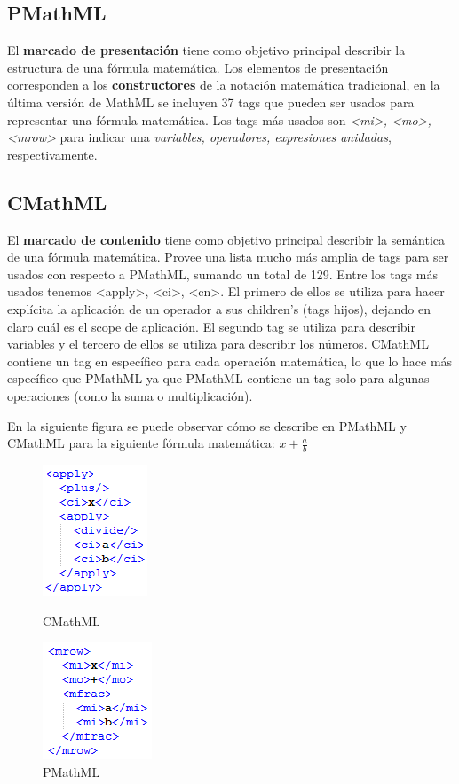 \subsection{PMathML}

El \textbf{marcado de presentación} tiene como objetivo principal describir la estructura de una fórmula matemática.
Los elementos de presentación corresponden a los \textbf{constructores} de la notación matemática tradicional, en la última versión de MathML se incluyen
37 tags que pueden ser usados para representar una fórmula matemática. Los tags más usados son \textit{<mi>, <mo>, <mrow>} para indicar una \textit{variables, operadores,
expresiones anidadas}, respectivamente.

\subsection{CMathML}

El \textbf{marcado de contenido} tiene como objetivo principal describir la semántica de una fórmula matemática.
Provee una lista mucho más amplia de tags para ser usados con respecto a PMathML, sumando un total de 129.
Entre los tags más usados tenemos <apply>, <ci>, <cn>. El primero de ellos se utiliza para hacer explícita la aplicación de un
operador a sus children's (tags hijos), dejando en claro cuál es el scope de aplicación. El segundo tag se utiliza para describir variables y el tercero
de ellos se utiliza para describir los números. CMathML contiene un tag en específico para cada operación matemática, lo que lo hace más específico que PMathML
ya que PMathML contiene un tag solo para algunas operaciones (como la suma o multiplicación).

En la siguiente figura se puede observar cómo se describe en PMathML y CMathML para la siguiente fórmula matemática: $x + \frac{a}{b}$

\begin{figure}[H]
\centering
  \begin{minipage}[b]{0.4\textwidth}
    \includegraphics{Figures/ejemplo_cmathml}
    \caption[]{CMathML}
  \end{minipage}
  \begin{minipage}[b]{0.4\textwidth}
    \includegraphics{Figures/ejemplo_pmathml}
    \caption[]{PMathML}
  \end{minipage}
\label{fig:ejemplo_cmathml}
\end{figure}

